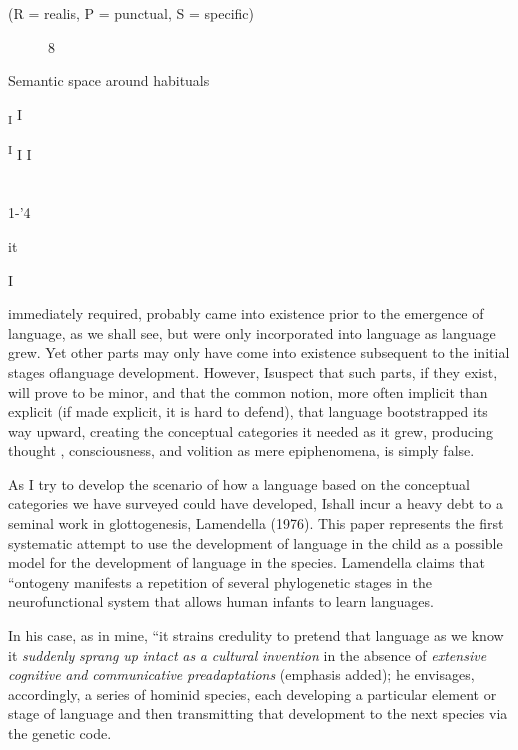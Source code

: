 (R = realis, P = punctual, S = specific)

\begin{figure}
\caption{8}
\label{fig:4}
\end{figure}

Semantic space around habituals


\textsubscript{I} I

\textsuperscript{I }I I 

\section{}
1-'4

it

I


immediately required, probably came into existence prior to the emergence of language, as we shall see, but were only incorporated into language as language grew. Yet other parts may only have come into existence subsequent to the initial stages oflanguage development. However, Isuspect that such parts, if they exist, will prove to be minor, and that the common notion, more often implicit than explicit (if made explicit, it is hard to defend), that language bootstrapped its way upward, creating the conceptual categories it needed as it grew, pro\-ducing thought , consciousness, and volition as mere epiphenomena, is simply false.

As I try to develop the scenario of how a language based on the conceptual categories we have surveyed could have developed, Ishall incur a heavy debt to a seminal work in glottogenesis, Lamen\-della (1976). This paper represents the first systematic attempt to use the development of language in the child as a possible model for the development of language in the species. Lamendella claims that ``on\-togeny manifests a repetition of several phylogenetic stages in the neurofunctional system that allows human infants to learn languages.{\textquotedbl}

In his
case,
as in mine, ``it strains credulity to pretend that language
as we know it \textit{suddenly} \textit{sprang} \textit{up} \textit{intact} \textit{as} \textit{a} \textit{cultural} \textit{invention} in the absence of \textit{extensive} \textit{cognitive} \textit{and} \textit{communicative} \textit{preadaptations{\textquotedbl}} (emphasis added); he envisages, accordingly, a series of hominid species, each developing a particular element or stage of language and then transmitting that development to the next species via the genetic code. 

